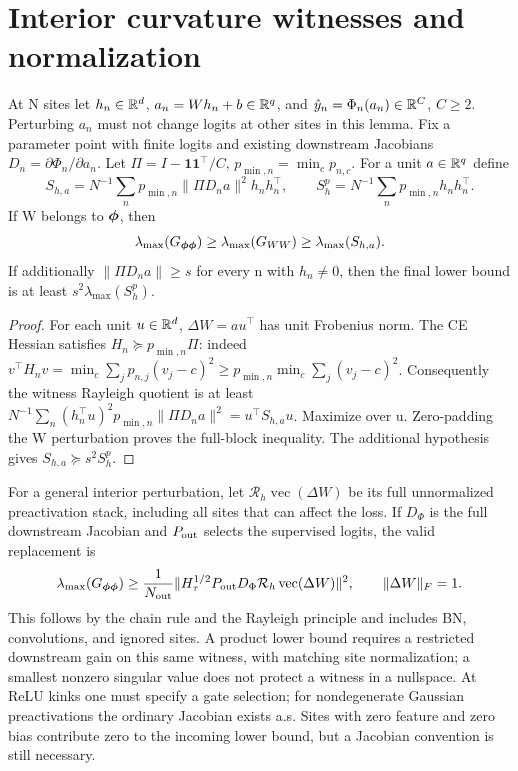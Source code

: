 \section{Interior curvature witnesses and normalization}
\label{sec:astra_interior}
\begin{lemma}
\label{lem:astra_interior}
At N sites let $h_n\in\mathbb{R}^d$, $a_n=Wh_n+b\in\mathbb{R}^q$, and
$\hat y_n=\Phi_n(a_n)\in\mathbb{R}^C$, $C\ge2$.
Perturbing $a_n$ must not change logits at other sites in this lemma.
Fix a parameter point with finite logits and existing downstream
Jacobians $D_n=\partial\Phi_n/\partial a_n$. Let
$\Pi=I-\boldsymbol1\boldsymbol1^\top/C$,
$p_{\min,n}=\min_c p_{n,c}$. For a unit $a\in\mathbb{R}^q$ define
\[
 S_{h,a}=N^{-1}\sum_n p_{\min,n}\|\Pi D_na\|^2h_nh_n^\top,
 \qquad S_h^p=N^{-1}\sum_n p_{\min,n}h_nh_n^\top.
\]
If W belongs to ${\boldsymbol{\phi}}$, then
\[
 \lambda_{\max}(G_{{\boldsymbol{\phi}}{\boldsymbol{\phi}}})\ge\lambda_{\max}(G_{WW})
 \ge\lambda_{\max}(S_{h,a}).
\]
If additionally $\|\Pi D_na\|\ge s$ for every n with $h_n\ne0$,
then the final lower bound is at least $s^2\lambda_{\max}(S_h^p)$.
\end{lemma}
\begin{proof}
For each unit $u\in\mathbb{R}^d$, $\Delta W=au^\top$ has unit Frobenius norm.
The CE Hessian satisfies $H_n\succeq p_{\min,n}\Pi$: indeed
$v^\top H_nv=\min_c\sum_jp_{n,j}(v_j-c)^2
\ge p_{\min,n}\min_c\sum_j(v_j-c)^2$.
Consequently the witness Rayleigh quotient is at least
$N^{-1}\sum_n(h_n^\top u)^2p_{\min,n}\|\Pi D_na\|^2
=u^\top S_{h,a}u$. Maximize over u. Zero-padding the W perturbation
proves the full-block inequality. The additional hypothesis gives
$S_{h,a}\succeq s^2S_h^p$.
\end{proof}
\begin{remark}
For a general interior perturbation, let $\mathcal R_h\operatorname{vec}
(\Delta W)$ be its full unnormalized preactivation stack, including all
sites that can affect the loss. If $D_\Phi$ is the full downstream
Jacobian and $P_{\rm out}$ selects the supervised logits, the valid
replacement is
\begin{equation}\label{eq:astra_full_witness}
 \lambda_{\max}(G_{{\boldsymbol{\phi}}{\boldsymbol{\phi}}})\ge
 \frac1{N_{\rm out}}\|H_\tau^{1/2}P_{\rm out}D_\Phi
       \mathcal R_h\operatorname{vec}(\Delta W)\|^2,
 \qquad\|\Delta W\|_F=1.
\end{equation}
This follows by the chain rule and the Rayleigh principle and includes
BN, convolutions, and ignored sites. A product lower bound requires a
restricted downstream gain on this same witness, with matching site
normalization; a smallest nonzero singular value does not protect a
witness in a nullspace. At ReLU kinks one must specify a gate selection;
for nondegenerate Gaussian preactivations the ordinary Jacobian exists
a.s. Sites with zero feature and zero bias contribute zero to the
incoming lower bound, but a Jacobian convention is still necessary.
\end{remark}

